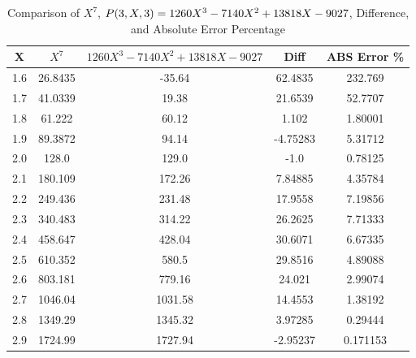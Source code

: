 ﻿\begin{table}[h!]
    \centering
    \caption{Comparison of $X^7$, ${P}(3,X,3) = 1260X^3 - 7140X^2 + 13818X - 9027$, Difference, and Absolute Error Percentage}
    \begin{tabular}{|c|c|c|c|c|}
        \hline
        \textbf{X} & $X^7$   & $1260X^3 - 7140X^2 + 13818X - 9027$ & \textbf{Diff} & \textbf{ABS Error \%} \\ \hline
        1.6        & 26.8435 & -35.64                              & 62.4835       & 232.769               \\ \hline
        1.7        & 41.0339 & 19.38                               & 21.6539       & 52.7707               \\ \hline
        1.8        & 61.222  & 60.12                               & 1.102         & 1.80001               \\ \hline
        1.9        & 89.3872 & 94.14                               & -4.75283      & 5.31712               \\ \hline
        2.0        & 128.0   & 129.0                               & -1.0          & 0.78125               \\ \hline
        2.1        & 180.109 & 172.26                              & 7.84885       & 4.35784               \\ \hline
        2.2        & 249.436 & 231.48                              & 17.9558       & 7.19856               \\ \hline
        2.3        & 340.483 & 314.22                              & 26.2625       & 7.71333               \\ \hline
        2.4        & 458.647 & 428.04                              & 30.6071       & 6.67335               \\ \hline
        2.5        & 610.352 & 580.5                               & 29.8516       & 4.89088               \\ \hline
        2.6        & 803.181 & 779.16                              & 24.021        & 2.99074               \\ \hline
        2.7        & 1046.04 & 1031.58                             & 14.4553       & 1.38192               \\ \hline
        2.8        & 1349.29 & 1345.32                             & 3.97285       & 0.29444               \\ \hline
        2.9        & 1724.99 & 1727.94                             & -2.95237      & 0.171153              \\ \hline

\end{tabular}
\end{table}
